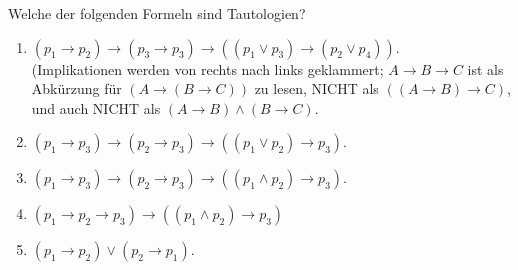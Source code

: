 
\begin{exercise}[21]

Welche der folgenden Formeln sind Tautologien?

\begin{enumerate}[label = \alph*.]
    \item $(p_1 \to p_2) \to (p_3 \to p_3) \to ((p_1 \lor p_3) \to (p_2 \lor p_4))$. \\
    (Implikationen werden von rechts nach links geklammert;
    $A \to B \to C$ ist als Abkürzung für $(A \to (B \to C))$ zu lesen, NICHT als $((A \to B) \to C)$, und auch NICHT als $(A \to B) \land (B \to C)$.
    \item $(p_1 \to p_3) \to (p_2 \to p_3) \to ((p_1 \lor p_2) \to p_3)$.
    \item $(p_1 \to p_3) \to (p_2 \to p_3) \to ((p_1 \land p_2) \to p_3)$.
    \item $(p_1 \to p_2 \to p_3) \to ((p_1 \land p_2) \to p_3)$
    \item $(p_1 \to p_2) \lor (p_2 \to p_1)$.
\end{enumerate}

\end{exercise}


